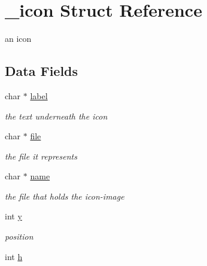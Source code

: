 \hypertarget{struct__icon}{
\section{\_\-icon Struct Reference}
\label{struct__icon}
}
an icon  


\subsection*{Data Fields}
\begin{CompactItemize}
\item 
\hypertarget{struct__icon_o0}{
char $\ast$ \hyperlink{struct__icon_o0}{label}}
\label{struct__icon_o0}

\begin{CompactList}\small\item\em the text underneath the icon \item\end{CompactList}\item 
\hypertarget{struct__icon_o1}{
char $\ast$ \hyperlink{struct__icon_o1}{file}}
\label{struct__icon_o1}

\begin{CompactList}\small\item\em the file it represents \item\end{CompactList}\item 
\hypertarget{struct__icon_o2}{
char $\ast$ \hyperlink{struct__icon_o2}{name}}
\label{struct__icon_o2}

\begin{CompactList}\small\item\em the file that holds the icon-image \item\end{CompactList}\item 
\hypertarget{struct__icon_o4}{
int \hyperlink{struct__icon_o4}{y}}
\label{struct__icon_o4}

\begin{CompactList}\small\item\em position \item\end{CompactList}\item 
\hypertarget{struct__icon_o6}{
int \hyperlink{struct__icon_o6}{h}}
\label{struct__icon_o6}


\end{CompactItemize}
